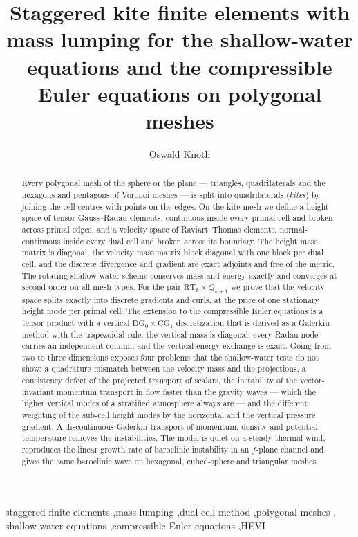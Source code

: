 \documentclass[preprint,12pt]{elsarticle}
\theoremstyle{definition}
\begin{document}
\begin{frontmatter}
\title{Staggered kite finite elements with mass lumping for the shallow-water equations and the
compressible Euler equations on polygonal meshes}

\author{Oswald Knoth}

\begin{abstract}
Every polygonal mesh of the sphere or the plane --- triangles, quadrilaterals and the hexagons and
pentagons of Voronoi meshes --- is split into quadrilaterals (\emph{kites}) by joining the cell centres
with points on the edges. On the kite mesh we define a height space of tensor Gauss--Radau elements,
continuous inside every primal cell and broken across primal edges, and a velocity space of
Raviart--Thomas elements, normal-continuous inside every dual cell and broken across its boundary.
The height mass matrix is diagonal, the velocity mass matrix block diagonal with one block per dual
cell, and the discrete divergence and gradient are exact adjoints and free of the metric. The rotating
shallow-water scheme conserves mass and energy exactly and converges at second order on all mesh types.
For the pair $\mathrm{RT}_k\times Q_{k+1}$ we prove that the velocity space splits exactly into discrete
gradients and curls, at the price of one stationary height mode per primal cell.
The extension to the compressible Euler equations is a tensor product with a vertical $\mathrm{DG}_0\times
\mathrm{CG}_1$ discretization that is derived as a Galerkin method with the trapezoidal rule: the vertical
mass is diagonal, every Radau node carries an independent column, and the vertical energy exchange is
exact. Going from two to three dimensions exposes four problems that the shallow-water tests do not show:
a quadrature mismatch between the velocity mass and the projections, a consistency defect of the projected
transport of scalars, the instability of the vector-invariant momentum transport in flow faster than the
gravity waves --- which the higher vertical modes of a stratified atmosphere always are --- and the
different weighting of the sub-cell height modes by the horizontal and the vertical pressure gradient.
A discontinuous Galerkin transport of momentum, density and potential temperature removes the
instabilities. The model is quiet on a steady thermal wind, reproduces the linear growth rate of
baroclinic instability in an $f$-plane channel and gives the same baroclinic wave on hexagonal,
cubed-sphere and triangular meshes.
\end{abstract}

\begin{keyword}
staggered finite elements \sep mass lumping \sep dual cell method \sep polygonal meshes \sep
shallow-water equations \sep compressible Euler equations \sep HEVI
\end{keyword}
\end{frontmatter}
\end{document}
